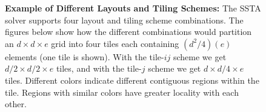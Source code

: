 \documentclass[10pt, conference, compsocconf]{IEEEtran}
\begin{document}
\begin{figure}[!bth]
  \centering
  \caption{\small
    \textbf{Example of Different Layouts and Tiling Schemes:}
      The SSTA solver supports four layout and tiling scheme combinations.
      The figures below show how the different combinations would partition an
        \(d \times d \times e\) grid into four tiles each containing
        \((d^2/4)(e)\) elements (one tile is shown).
      With the tile-\(ij\) scheme we get \(d/2 \times d/2 \times e\) tiles,
        and with the tile-\(j\) scheme we get \(d \times d/4 \times e\) tiles.
      Different colors indicate different contiguous regions within the tile.
      Regions with similar colors have greater locality with each other. 
  }
  \label{fig:impl:tiling_schemes}
  \begin{minipage}{0.49\textwidth}
    \centering
  \end{minipage}
  \begin{minipage}{0.49\textwidth}
    \centering
\end{minipage}
\end{figure}
\end{document}
